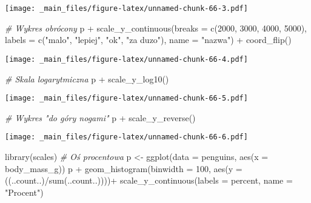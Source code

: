 \documentclass[
]{book}
\newenvironment{Shaded}{\begin{snugshade}}{\end{snugshade}}
\newcommand{\AttributeTok}[1]{\textcolor[rgb]{0.77,0.63,0.00}{#1}}
\newcommand{\CommentTok}[1]{\textcolor[rgb]{0.56,0.35,0.01}{\textit{#1}}}
\newcommand{\DecValTok}[1]{\textcolor[rgb]{0.00,0.00,0.81}{#1}}
\newcommand{\FunctionTok}[1]{\textcolor[rgb]{0.00,0.00,0.00}{#1}}
\newcommand{\NormalTok}[1]{#1}
\newcommand{\OtherTok}[1]{\textcolor[rgb]{0.56,0.35,0.01}{#1}}
\newcommand{\SpecialCharTok}[1]{\textcolor[rgb]{0.00,0.00,0.00}{#1}}
\newcommand{\StringTok}[1]{\textcolor[rgb]{0.31,0.60,0.02}{#1}}
\begin{document}
\texttt{[image: \_main\_files/figure-latex/unnamed-chunk-66-3.pdf]}

\begin{Shaded}
\begin{Highlighting}[]
\CommentTok{\# Wykres obrócony}
\NormalTok{p }\SpecialCharTok{+} \FunctionTok{scale\_y\_continuous}\NormalTok{(}\AttributeTok{breaks =} \FunctionTok{c}\NormalTok{(}\DecValTok{2000}\NormalTok{, }\DecValTok{3000}\NormalTok{, }\DecValTok{4000}\NormalTok{, }\DecValTok{5000}\NormalTok{), }
                       \AttributeTok{labels =} \FunctionTok{c}\NormalTok{(}\StringTok{"malo"}\NormalTok{, }\StringTok{"lepiej"}\NormalTok{, }\StringTok{"ok"}\NormalTok{, }\StringTok{"za duzo"}\NormalTok{), }
                       \AttributeTok{name =} \StringTok{"nazwa"}\NormalTok{) }\SpecialCharTok{+} \FunctionTok{coord\_flip}\NormalTok{()}
\end{Highlighting}
\end{Shaded}

\texttt{[image: \_main\_files/figure-latex/unnamed-chunk-66-4.pdf]}

\begin{Shaded}
\begin{Highlighting}[]
\CommentTok{\# Skala logarytmiczna}
\NormalTok{p }\SpecialCharTok{+} \FunctionTok{scale\_y\_log10}\NormalTok{()}
\end{Highlighting}
\end{Shaded}

\texttt{[image: \_main\_files/figure-latex/unnamed-chunk-66-5.pdf]}

\begin{Shaded}
\begin{Highlighting}[]
\CommentTok{\# Wykres "do góry nogami"}
\NormalTok{p }\SpecialCharTok{+} \FunctionTok{scale\_y\_reverse}\NormalTok{()}
\end{Highlighting}
\end{Shaded}

\texttt{[image: \_main\_files/figure-latex/unnamed-chunk-66-6.pdf]}

\begin{Shaded}
\begin{Highlighting}[]
\FunctionTok{library}\NormalTok{(scales)}
\CommentTok{\# Oś procentowa}
\NormalTok{p }\OtherTok{\textless{}{-}} \FunctionTok{ggplot}\NormalTok{(}\AttributeTok{data =}\NormalTok{ penguins, }\FunctionTok{aes}\NormalTok{(}\AttributeTok{x =}\NormalTok{ body\_mass\_g))}
\NormalTok{p }\SpecialCharTok{+} \FunctionTok{geom\_histogram}\NormalTok{(}\AttributeTok{binwidth =} \DecValTok{100}\NormalTok{, }\FunctionTok{aes}\NormalTok{(}\AttributeTok{y =}\NormalTok{ ((..count..)}\SpecialCharTok{/}\FunctionTok{sum}\NormalTok{(..count..))))}\SpecialCharTok{+}
  \FunctionTok{scale\_y\_continuous}\NormalTok{(}\AttributeTok{labels =}\NormalTok{ percent, }\AttributeTok{name =} \StringTok{"Procent"}\NormalTok{)}
\end{Highlighting}
\end{Shaded}
\end{document}
